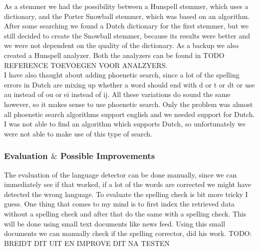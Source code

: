 As a stemmer we had the possibility between a Hunspell stemmer, which uses a dictionary, and the Porter Snowball stemmer, which was based on an algorithm. After some searching we found a Dutch dictionary for the first stemmer, but we still decided to create the Snowball stemmer, because its results were better and we were not dependent on the quality of the dictionary. As a backup we also created a Hunspell analyzer. Both the analyzers can be found in TODO REFERENCE TOEVOEGEN VOOR ANALZYERS.\\
I have also thaught about adding phoenetic search, since a lot of the spelling errors in Dutch are mixing up whether a word should end with d or t or dt or use au instead of ou or ei instead of ij. All these variations do sound the same however, so it makes sense to use phoenetic search. Only the problem was almost all phoenetic search algorithms support english and we needed support for Dutch. I was not able to find an algorithm which supports Dutch, so unfortunately we were not able to make use of this type of search.

\subsubsection*{Evaluation $\&$ Possible Improvements }
The evaluation of the language detector can be done manually, since we can immediately see if that worked, if a lot of the words are corrected we might have detected the wrong language. To evaluate the spelling check is bit more tricky I guess. One thing that comes to my mind is to first index the retrieved data without a spelling check and after that do the same with a spelling check. This will be done using small text documents like news feed. Using this small documents we can manually check if the spelling corrector, did his work.
TODO: BREIDT DIT UIT EN IMPROVE DIT NA TESTEN
